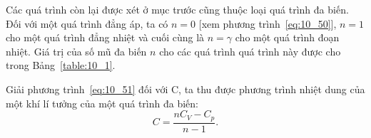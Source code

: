 Các quá trình còn lại được xét ở mục trước cũng thuộc loại quá trình đa biến. Đối với một quá trình đẳng áp, ta có $n=0$ [xem phương trình~\eqref{eq:10_50}], $n=1$ cho một quá trình đẳng nhiệt và cuối cùng là $n=\gamma$ cho một quá trình đoạn nhiệt. Giá trị của số mũ đa biến $n$ cho các quá trình quá trình này được cho trong Bảng~\ref{table:10_1}.    

\begin{table}[!htb]
	\renewcommand{\arraystretch}{1.2}
	\caption{ }
	\vspace{-0.6cm}
	\label{table:10_1}
	\begin{center}\end{center}
\end{table}


Giải phương trình~\eqref{eq:10_51} đối với C, ta thu được phương trình nhiệt dung của một khí lí tưởng của một quá trình đa biến:
\begin{equation}\label{eq:10_52}
	C = \frac{n C_V - C_p}{n - 1}.
\end{equation}

